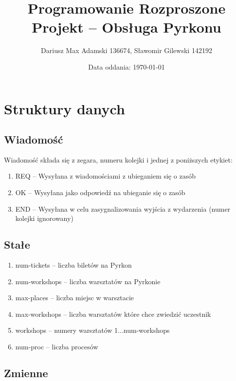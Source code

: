 \documentclass[11pt]{article}
\title{Programowanie Rozproszone\\ Projekt -- Obsługa Pyrkonu}
\author{Dariusz Max Adamski 136674, Sławomir Gilewski 142192}
\affil{\{dariusz.adamski,slawomir.gilewski\}@student.put.poznan.pl}
\date{Data oddania: \today}
\begin{document}
\maketitle


\section{Struktury danych}

\subsection{Wiadomość}

Wiadomość składa się z zegara, numeru kolejki i jednej z poniższych etykiet:

\begin{enumerate}
    \item REQ -- Wysyłana z wiadomościami z ubieganiem się o zasób
    \item OK  -- Wysyłana jako odpowiedź na ubieganie się o zasób
    \item END -- Wysyłana w celu zasygnalizowania wyjścia z wydarzenia (numer kolejki ignorowany)
\end{enumerate}

\subsection{Stałe}

\begin{enumerate}
    \item num-tickets -- liczba biletów na Pyrkon
    \item num-workshops -- liczba warsztatów na Pyrkonie
    \item max-places -- liczba miejsc w warsztacie
    \item max-workshops -- liczba warsztatów które chce zwiedzić uczestnik
    \item workshops -- numery warsztatów 1...num-workshops
    \item num-proc -- liczba procesów
\end{enumerate}

\subsection{Zmienne}
\end{document}
